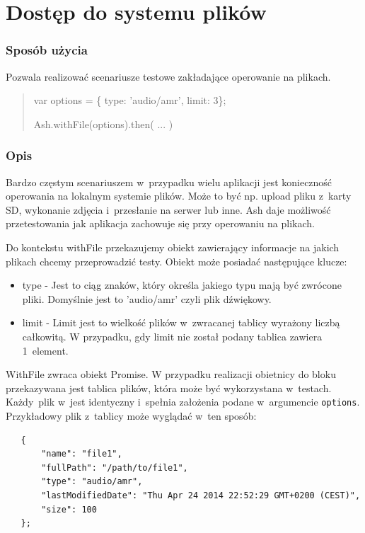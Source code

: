 \documentclass[brudnopis]{xmgr}
\begin{document}
\section{Dostęp do systemu plików}

\subsubsection{Sposób użycia}
Pozwala realizować scenariusze testowe zakładające operowanie na plikach.

\begin{quote}
var options = \{ type: 'audio/amr', limit: 3\};

Ash.withFile(options).then( ... )
\end{quote}

\subsubsection{Opis}

Bardzo częstym scenariuszem w~przypadku wielu aplikacji jest konieczność operowania na lokalnym systemie plików. Może to być np. upload pliku z~karty SD, wykonanie zdjęcia i~przesłanie na serwer lub inne. Ash daje możliwość przetestowania jak aplikacja zachowuje się przy operowaniu na plikach.  

Do kontekstu withFile przekazujemy obiekt zawierający informacje na jakich plikach chcemy przeprowadzić testy. Obiekt może posiadać następujące klucze:

\begin{itemize}
  \item type - Jest to ciąg znaków, który określa jakiego typu mają być zwrócone pliki. Domyślnie jest to 'audio/amr' czyli plik dźwiękowy. 
  \item limit - Limit jest to wielkość plików w~zwracanej tablicy wyrażony liczbą całkowitą. W przypadku, gdy limit nie został podany tablica zawiera 1~element. 
\end{itemize}

WithFile zwraca obiekt Promise. W przypadku realizacji obietnicy do bloku przekazywana jest tablica plików, która może być wykorzystana w~testach. Każdy~plik w~jest identyczny i~spełnia założenia podane w~argumencie \texttt{options}. Przykładowy plik z~tablicy może wyglądać w~ten sposób:

\begin{lstlisting}
   {
       "name": "file1",
       "fullPath": "/path/to/file1",
       "type": "audio/amr",
       "lastModifiedDate": "Thu Apr 24 2014 22:52:29 GMT+0200 (CEST)",
       "size": 100
   };
\end{lstlisting}
\end{document}
